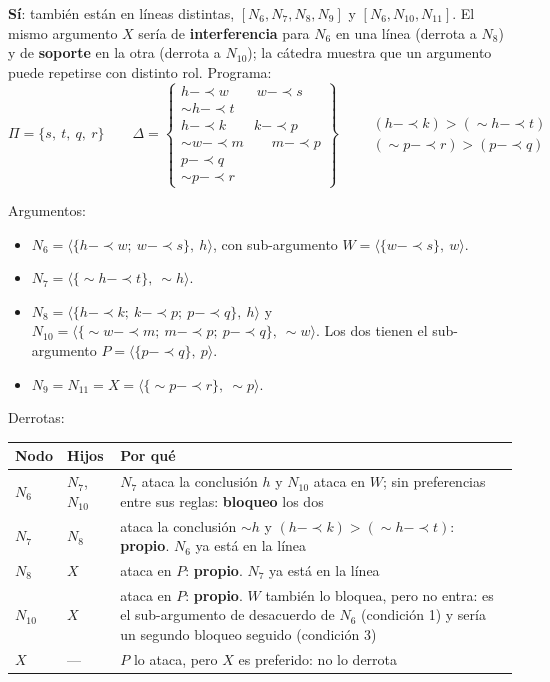 \documentclass[11pt,a4paper]{article}
\newcommand{\reb}{\mathrel{-\!\!\!\prec}}         %
\begin{document}
\textbf{Sí}: también están en líneas distintas, $[N_6, N_7, N_8, N_9]$ y $[N_6, N_{10}, N_{11}]$. El mismo argumento $X$ sería de \textbf{interferencia} para $N_6$ en una línea (derrota a $N_8$) y de \textbf{soporte} en la otra (derrota a $N_{10}$); la cátedra muestra que un argumento puede repetirse con distinto rol. Programa:
\[
\Pi = \{s,\ t,\ q,\ r\}
\qquad
\Delta = \left\{\begin{array}{l}
h \reb w \qquad w \reb s \\
{\sim}h \reb t \\
h \reb k \qquad k \reb p \\
{\sim}w \reb m \qquad m \reb p \\
p \reb q \\
{\sim}p \reb r
\end{array}\right\}
\qquad
\begin{array}{l}
(h \reb k) > ({\sim}h \reb t) \\
({\sim}p \reb r) > (p \reb q)
\end{array}
\]

Argumentos:
\begin{itemize}
  \item $N_6 = \langle \{h \reb w;\ w \reb s\},\ h\rangle$, con sub-argumento $W = \langle \{w \reb s\},\ w\rangle$.
  \item $N_7 = \langle \{{\sim}h \reb t\},\ {\sim}h\rangle$.
  \item $N_8 = \langle \{h \reb k;\ k \reb p;\ p \reb q\},\ h\rangle$ y $N_{10} = \langle \{{\sim}w \reb m;\ m \reb p;\ p \reb q\},\ {\sim}w\rangle$. Los dos tienen el sub-argumento $P = \langle \{p \reb q\},\ p\rangle$.
  \item $N_9 = N_{11} = X = \langle \{{\sim}p \reb r\},\ {\sim}p\rangle$.
\end{itemize}

Derrotas:
\begin{center}
\small
\begin{tabularx}{\linewidth}{@{}l l >{\raggedright\arraybackslash}X@{}}
\toprule
\textbf{Nodo} & \textbf{Hijos} & \textbf{Por qué} \\
\midrule
$N_6$ & $N_7$, $N_{10}$ & $N_7$ ataca la conclusión $h$ y $N_{10}$ ataca en $W$; sin preferencias entre sus reglas: \textbf{bloqueo} los dos \\
$N_7$ & $N_8$ & ataca la conclusión ${\sim}h$ y $(h \reb k) > ({\sim}h \reb t)$: \textbf{propio}. $N_6$ ya está en la línea \\
$N_8$ & $X$ & ataca en $P$: \textbf{propio}. $N_7$ ya está en la línea \\
$N_{10}$ & $X$ & ataca en $P$: \textbf{propio}. $W$ también lo bloquea, pero no entra: es el sub-argumento de desacuerdo de $N_6$ (condición 1) y sería un segundo bloqueo seguido (condición 3) \\
$X$ & --- & $P$ lo ataca, pero $X$ es preferido: no lo derrota \\
\bottomrule
\end{tabularx}
\end{center}
\end{document}
